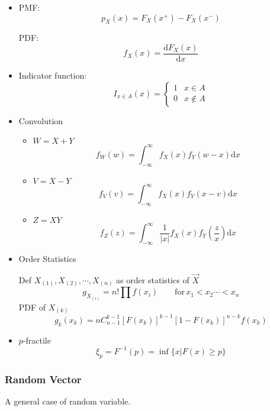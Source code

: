     \begin{itemize}
        \item

        \begin{center}
            \parbox[t]{8.65cm}{PMF:\[p_X(x)=F_X(x^+)-F_X(x^-)\]}
            \parbox[t]{8.65cm}{PDF:
            \[
                f_X(x)=\frac{\mathrm{d}F_X(x)}{\mathrm{d}x}
            \]}
        \end{center}
        
        
        
        \item Indicator function:
        \[
            I_{x\in A}(x)=\begin{cases}
                1& x\in  A\\
                0& x\notin A
            \end{cases}
        \]
        \item Convolution
        \begin{itemize}
            \item $W=X+Y$
            \[
                f_W(w)=\int_{-\infty}^\infty f_X(x)f_Y(w-x)\mathrm{d}x    
            \]
            \item $V=X-Y$
            \[
                f_V(v)=\int_{-\infty}^\infty f_X(x)f_Y(x-v)\mathrm{d}x    
            \]
            \item $Z=XY$
            \[
                f_Z(z)=\int_{-\infty}^\infty \frac{1}{|x|}f_X(x)f_Y(\frac{z}{x})\mathrm{d}x
            \]
        \end{itemize}
        
        \item Order Statistics
        
        Def $X_{(1)},X_{(2)},\cdots,X_{(n)}$ as order statistics of $\vec{X}$
        \[
            g_{X_{(i)}}=n!\prod f(x_i)\qquad \mathrm{for}\, x_1<x_2\cdots <x_n    
        \]
        PDF of $X_{(k)}$
        \[
            g_k(x_k)=nC_{n-1}^{k-1}[F(x_k)]^{k-1}[1-F(x_k)]^{n-k}f(x_k)
        \]
        \item $p$-fractile
        \[\xi_p=F^{-1}(p)=\inf\{x|F(x)\geq p\}\]
    \end{itemize}






\subsubsection{Random Vector}
    A general case of random variable.

